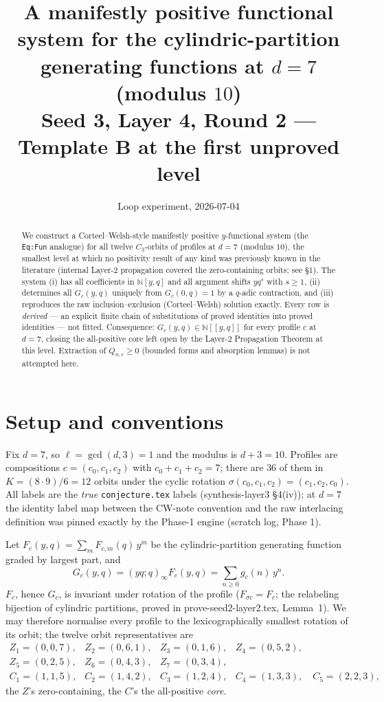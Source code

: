 \documentclass[11pt]{article}
\title{A manifestly positive functional system for the cylindric-partition
generating functions at $d=7$ (modulus $10$)\\
\large Seed 3, Layer 4, Round 2 --- Template B at the first unproved level}
\author{Loop experiment, 2026-07-04}
\date{}
\newcommand{\NN}{\mathbb{N}}
\begin{document}
\maketitle

\begin{abstract}
We construct a Corteel--Welsh-style manifestly positive $y$-functional system
(the \texttt{Eq:Fun} analogue) for all twelve $C_3$-orbits of profiles at $d=7$
(modulus $10$), the smallest level at which no positivity result of any kind was
previously known in the literature (internal Layer-2 propagation covered the
zero-containing orbits; see \S1). The system (i) has all coefficients in $\NN[y,q]$ and all argument
shifts $yq^{s}$ with $s\ge1$, (ii) determines all $G_c(y,q)$ uniquely from
$G_c(0,q)=1$ by a $q$-adic contraction, and (iii) reproduces the raw
inclusion--exclusion (Corteel--Welsh) solution exactly. Every row is \emph{derived}
--- an explicit finite chain of substitutions of proved identities into proved
identities --- not fitted. Consequence: $G_c(y,q)\in\NN[[y,q]]$ for every profile
$c$ at $d=7$, closing the all-positive core left open by the Layer-2 Propagation
Theorem at this level. Extraction of $Q_{n,c}\ge0$ (bounded forms and absorption
lemmas) is not attempted here.
\end{abstract}

\section{Setup and conventions}

Fix $d=7$, so $\ell=\gcd(d,3)=1$ and the modulus is $d+3=10$. Profiles are
compositions $c=(c_0,c_1,c_2)$ with $c_0+c_1+c_2=7$; there are $36$ of them in
$K=(8\cdot9)/6=12$ orbits under the cyclic rotation
$\sigma(c_0,c_1,c_2)=(c_1,c_2,c_0)$. All labels are the \emph{true}
\texttt{conjecture.tex} labels (synthesis-layer3 \S4(iv)); at $d=7$ the identity
label map between the CW-note convention and the raw interlacing definition was
pinned exactly by the Phase-1 engine (scratch log, Phase 1).

Let $F_c(y,q)=\sum_m F_{c,m}(q)\,y^m$ be the cylindric-partition generating
function graded by largest part, and
\[
G_c(y,q)=(yq;q)_\infty F_c(y,q)=\sum_{n\ge0}g_c(n)\,y^n .
\]
$F_c$, hence $G_c$, is invariant under rotation of the profile
($F_{\sigma c}=F_c$; the relabeling bijection of cylindric partitions, proved in
prove-seed2-layer2.tex, Lemma~1). We may therefore normalise every profile to the
lexicographically smallest rotation of its orbit; the twelve orbit representatives
are
\[
\begin{array}{llll}
Z_1=(0,0,7), & Z_2=(0,6,1), & Z_3=(0,1,6), & Z_4=(0,5,2),\\
Z_5=(0,2,5), & Z_6=(0,4,3), & Z_7=(0,3,4), &\\
C_1=(1,1,5), & C_2=(1,4,2), & C_3=(1,2,4), & C_4=(1,3,3),\quad C_5=(2,2,3),
\end{array}
\]
the $Z$'s zero-containing, the $C$'s the all-positive \emph{core}.
\end{document}
